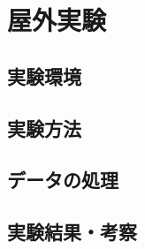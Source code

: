 \documentclass[../main]{subfiles}
\begin{document}
\graphicspath{{../figures/chap4/}}

\section{屋外実験}
\label{sec:vexp_cone-index}

\subsection{実験環境}
\label{subsec:vexp_ci_environment}

\subsection{実験方法}
\label{subsec:vexp_ci_method}

\subsection{データの処理}
\label{subsec:vexp_ci_processing}

\subsection{実験結果・考察}
\label{subsec:vexp_ci_result}
\end{document}
